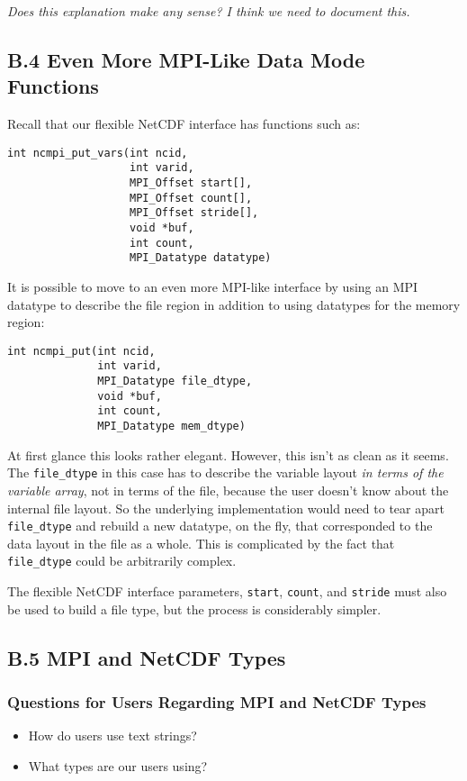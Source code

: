 \documentclass[10pt]{article}
\begin{document}
\emph{Does this explanation make any sense?  I think we need to document this.}

\subsection*{B.4  Even More MPI-Like Data Mode Functions}

Recall that our flexible NetCDF interface has functions such as:
\begin{verbatim}
int ncmpi_put_vars(int ncid,
                   int varid,
                   MPI_Offset start[],
                   MPI_Offset count[],
                   MPI_Offset stride[],
                   void *buf,
                   int count,
                   MPI_Datatype datatype)
\end{verbatim}

It is possible to move to an even more MPI-like interface by using an MPI
datatype to describe the file region in addition to using datatypes for the
memory region:
\begin{verbatim}
int ncmpi_put(int ncid,
              int varid,
              MPI_Datatype file_dtype,
              void *buf,
              int count,
              MPI_Datatype mem_dtype)
\end{verbatim}

At first glance this looks rather elegant.  However, this isn't as clean as it
seems.  The \texttt{file\_dtype} in this case has to describe the variable
layout \emph{in terms of the variable array}, not in terms of the file,
because the user doesn't know about the internal file layout.  So the
underlying implementation would need to tear apart \texttt{file\_dtype} and
rebuild a new datatype, on the fly, that corresponded to the data layout in
the file as a whole.  This is complicated by the fact that
\texttt{file\_dtype} could be arbitrarily complex.

The flexible NetCDF interface parameters, \texttt{start}, \texttt{count}, and
\texttt{stride} must also be used to build a file type, but the process is
considerably simpler.

\subsection*{B.5  MPI and NetCDF Types}

\subsubsection*{Questions for Users Regarding MPI and NetCDF Types}

\begin{itemize}
\item How do users use text strings?
\item What types are our users using?
\end{itemize}
\end{document}
